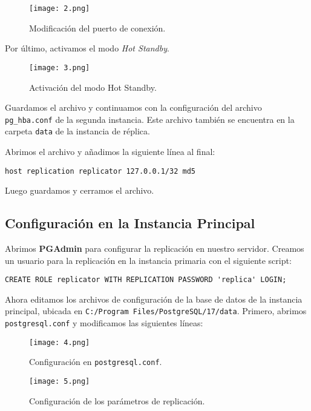 \documentclass{article}
\begin{document}
\begin{figure}[h]
    \centering
    \texttt{[image: 2.png]}
    \caption{Modificación del puerto de conexión.}
\end{figure}

Por último, activamos el modo \textit{Hot Standby}.

\begin{figure}[h]
    \centering
    \texttt{[image: 3.png]}
    \caption{Activación del modo Hot Standby.}
\end{figure}

Guardamos el archivo y continuamos con la configuración del archivo \texttt{pg\_hba.conf} de la segunda instancia. Este archivo también se encuentra en la carpeta \texttt{data} de la instancia de réplica.

Abrimos el archivo y añadimos la siguiente línea al final:

\begin{verbatim}
host replication replicator 127.0.0.1/32 md5
\end{verbatim}

Luego guardamos y cerramos el archivo.

\newpage
\subsection{Configuración en la Instancia Principal}

Abrimos \textbf{PGAdmin} para configurar la replicación en nuestro servidor. Creamos un usuario para la replicación en la instancia primaria con el siguiente script:

\begin{verbatim}
CREATE ROLE replicator WITH REPLICATION PASSWORD 'replica' LOGIN;
\end{verbatim}

Ahora editamos los archivos de configuración de la base de datos de la instancia principal, ubicada en \texttt{C:/Program Files/PostgreSQL/17/data}. Primero, abrimos \texttt{postgresql.conf} y modificamos las siguientes líneas:

\begin{figure}[h]
    \centering
    \texttt{[image: 4.png]}
    \caption{Configuración en \texttt{postgresql.conf}.}
\end{figure}

\begin{figure}[h]
    \centering
    \texttt{[image: 5.png]}
    \caption{Configuración de los parámetros de replicación.}
\end{figure}
\end{document}
